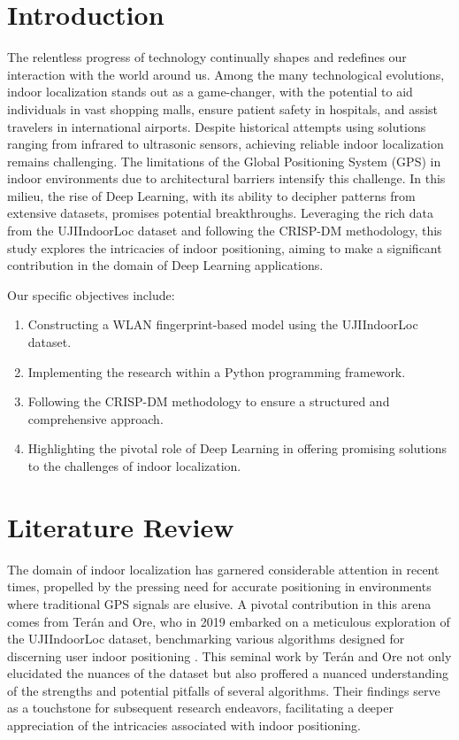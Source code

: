 \documentclass[conference]{IEEEtran}
\begin{document}
\maketitle


\section{Introduction}
The relentless progress of technology continually shapes and redefines our interaction with the world around us. Among the many technological evolutions, indoor localization stands out as a game-changer, with the potential to aid individuals in vast shopping malls, ensure patient safety in hospitals, and assist travelers in international airports. Despite historical attempts using solutions ranging from infrared to ultrasonic sensors, achieving reliable indoor localization remains challenging. The limitations of the Global Positioning System (GPS) in indoor environments due to architectural barriers intensify this challenge. In this milieu, the rise of Deep Learning, with its ability to decipher patterns from extensive datasets, promises potential breakthroughs. Leveraging the rich data from the UJIIndoorLoc dataset and following the CRISP-DM methodology, this study explores the intricacies of indoor positioning, aiming to make a significant contribution in the domain of Deep Learning applications.

Our specific objectives include:
\begin{enumerate}
\item Constructing a WLAN fingerprint-based model using the UJIIndoorLoc dataset.
\item Implementing the research within a Python programming framework.
\item Following the CRISP-DM methodology to ensure a structured and comprehensive approach.
\item Highlighting the pivotal role of Deep Learning in offering promising solutions to the challenges of indoor localization.
\end{enumerate}


\section{Literature Review}

The domain of indoor localization has garnered considerable attention in recent times, propelled by the pressing need for accurate positioning in environments where traditional GPS signals are elusive. A pivotal contribution in this arena comes from Terán and Ore, who in 2019 embarked on a meticulous exploration of the UJIIndoorLoc dataset, benchmarking various algorithms designed for discerning user indoor positioning \textcolor{blue}{\cite{teran2019benchmark}}. This seminal work by Terán and Ore not only elucidated the nuances of the dataset but also proffered a nuanced understanding of the strengths and potential pitfalls of several algorithms. Their findings serve as a touchstone for subsequent research endeavors, facilitating a deeper appreciation of the intricacies associated with indoor positioning.
\end{document}
